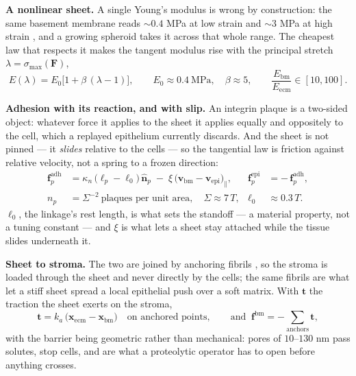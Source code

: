 \documentclass[10pt,a4paper]{article}
\begin{document}
\textbf{A nonlinear sheet.} A single Young's modulus is wrong by construction: the same basement
membrane reads $\sim\!0.4$ MPa at low strain and $\sim\!3$ MPa at high strain \cite{candiello2007}, and a growing spheroid
takes it across that whole range. The cheapest law that respects it makes the tangent modulus rise with
the principal stretch $\lambda=\sigma_{\max}(\mathbf F)$,
%
\begin{equation}
E(\lambda)=E_0\bigl[1+\beta\,(\lambda-1)\bigr],
\qquad E_0\approx 0.4\ \text{MPa},\quad \beta\approx 5,
\qquad \frac{E_{\text{bm}}}{E_{\text{ecm}}}\in[10,100].
\label{eq:bmstiff}
\end{equation}

\textbf{Adhesion with its reaction, and with slip.} An integrin plaque is a two-sided object: whatever
force it applies to the sheet it applies equally and oppositely to the cell, which a replayed
epithelium currently discards. And the sheet is not pinned --- it \emph{slides} relative to the cells
--- so the tangential law is friction against relative velocity, not a spring to a frozen direction:
%
\begin{align}
\mathbf f^{\text{adh}}_p &= \kappa_n\,\bigl(\ell_p-\ell_0\bigr)\,\hat{\mathbf n}_p
\;-\;\xi\,\bigl(\mathbf v_{\text{bm}}-\mathbf v_{\text{epi}}\bigr)_{\parallel},
&\mathbf f^{\text{epi}}_p&=-\,\mathbf f^{\text{adh}}_p,
\label{eq:adh}\\[2pt]
n_p &= \Sigma^{-2}\ \text{plaques per unit area}, \quad \Sigma\approx 7\,T,
&\ell_0&\approx 0.3\,T .
\label{eq:plaque}
\end{align}
%
$\ell_0$, the linkage's rest length, is what sets the standoff --- a material property, not a tuning
constant --- and $\xi$ is what lets a sheet stay attached while the tissue slides underneath it.

\textbf{Sheet to stroma.} The two are joined by anchoring fibrils \cite{keene1987}, so the stroma is loaded through the
sheet and never directly by the cells; the same fibrils are what let a stiff sheet spread a local
epithelial push over a soft matrix. With $\mathbf t$ the traction the sheet exerts on the stroma,
%
\begin{equation}
\mathbf t = k_a\,\bigl(\mathbf x_{\text{ecm}}-\mathbf x_{\text{bm}}\bigr)\quad\text{on anchored
points},\qquad
\text{and }\ \mathbf f^{\text{bm}} = -\!\!\sum_{\text{anchors}}\!\mathbf t ,
\label{eq:anchor}
\end{equation}
%
with the barrier being geometric rather than mechanical: pores of $10$--$130$ nm pass solutes, stop
cells, and are what a proteolytic operator has to open before anything crosses.
\end{document}
